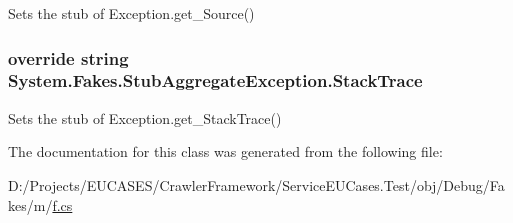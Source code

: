 Sets the stub of Exception.\-get\-\_\-\-Source()

\hypertarget{class_system_1_1_fakes_1_1_stub_aggregate_exception_a442146359bb9e67a42e8aff83b19d933}{
\subsubsection[{Stack\-Trace}]{\setlength{\rightskip}{0pt plus 5cm}override string System.\-Fakes.\-Stub\-Aggregate\-Exception.\-Stack\-Trace\hspace{0.3cm}{\ttfamily [get]}}}\label{class_system_1_1_fakes_1_1_stub_aggregate_exception_a442146359bb9e67a42e8aff83b19d933}


Sets the stub of Exception.\-get\-\_\-\-Stack\-Trace()



The documentation for this class was generated from the following file\-:\begin{DoxyCompactItemize}
\item 
D\-:/\-Projects/\-E\-U\-C\-A\-S\-E\-S/\-Crawler\-Framework/\-Service\-E\-U\-Cases.\-Test/obj/\-Debug/\-Fakes/m/\hyperlink{m_2f_8cs}{f.\-cs}\end{DoxyCompactItemize}
